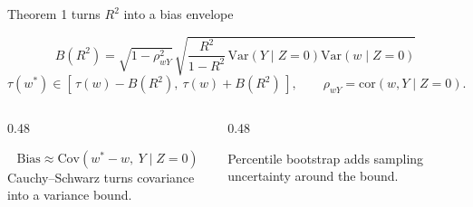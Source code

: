 \documentclass[aspectratio=169,10pt]{ctexbeamer}
\begin{document}
\begin{frame}{Theorem 1 turns $R^2$ into a bias envelope}
  \begin{bluebox}[title=Closed-form bound]
    \[
      B(R^2)=
      \sqrt{1-\rho_{wY}^2}\,
      \sqrt{
        \frac{R^2}{1-R^2}\,
        \mathrm{Var}(Y\mid Z=0)\mathrm{Var}(w\mid Z=0)
      }
    \]
    \[
      \tau(w^*)\in
      [\,\tau(w)-B(R^2),\ \tau(w)+B(R^2)\,],
      \qquad
      \rho_{wY}=\mathrm{cor}(w,Y\mid Z=0).
    \]
  \end{bluebox}
  \vspace{0.25cm}
  \begin{columns}[T,totalwidth=\textwidth]
    \begin{column}{0.48\textwidth}
      \begin{graybox}[title=Proof intuition]
        \[
          \mathrm{Bias}\approx
          \mathrm{Cov}(w^*-w,\ Y\mid Z=0)
        \]
        Cauchy--Schwarz turns covariance into a variance bound.
      \end{graybox}
    \end{column}
    \begin{column}{0.48\textwidth}
      \begin{yellowbox}[title=Inference]
        Percentile bootstrap adds sampling uncertainty around the bound.
      \end{yellowbox}
    \end{column}
  \end{columns}
\end{frame}
\end{document}
